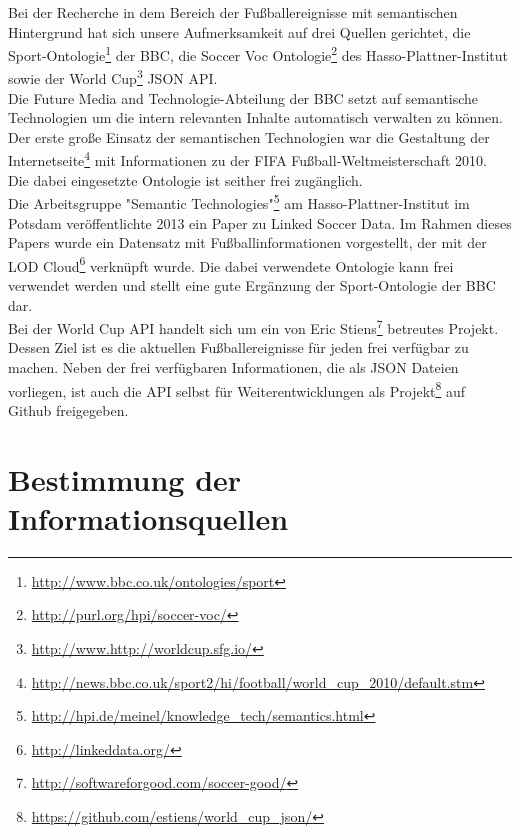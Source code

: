 \documentclass[runningheads,a4paper]{llncs}
\begin{document}
Bei der Recherche in dem Bereich der Fußballereignisse mit semantischen Hintergrund hat sich unsere Aufmerksamkeit auf drei Quellen gerichtet, die Sport-Ontologie\footnote{\url{http://www.bbc.co.uk/ontologies/sport}} der BBC, die Soccer Voc Ontologie\footnote{\url{http://purl.org/hpi/soccer-voc/}} des Hasso-Plattner-Institut sowie der World Cup\footnote{\url{http://www.http://worldcup.sfg.io/}} JSON API.\\ Die Future Media and Technologie-Abteilung der BBC setzt auf semantische Technologien um die intern relevanten Inhalte automatisch verwalten zu können. Der erste große Einsatz der semantischen Technologien war die Gestaltung der Internetseite\footnote{\url{http://news.bbc.co.uk/sport2/hi/football/world_cup_2010/default.stm}} mit Informationen zu der FIFA Fußball-Weltmeisterschaft 2010. Die dabei eingesetzte Ontologie ist seither frei zugänglich. \\
Die Arbeitsgruppe "Semantic Technologies"\footnote{\url{http://hpi.de/meinel/knowledge_tech/semantics.html}} am Hasso-Plattner-Institut im Potsdam veröffentlichte 2013 ein Paper zu Linked Soccer Data\cite{url_lsd}. Im Rahmen dieses Papers wurde ein Datensatz mit Fußballinformationen vorgestellt, der mit der LOD Cloud\footnote{\url{http://linkeddata.org/}} verknüpft wurde. Die dabei verwendete Ontologie kann frei verwendet werden und stellt eine gute Ergänzung der Sport-Ontologie der BBC dar.\\
Bei der World Cup API handelt sich um ein von Eric Stiens\footnote{\url{http://softwareforgood.com/soccer-good/}} betreutes Projekt. Dessen Ziel ist es die aktuellen Fußballereignisse für jeden frei verfügbar zu machen. Neben der frei verfügbaren Informationen, die als JSON Dateien vorliegen, ist auch die API selbst für Weiterentwicklungen als Projekt\footnote{\url{https://github.com/estiens/world_cup_json/}} auf Github freigegeben. 


\section{Bestimmung der Informationsquellen}\label{infoQuell}
\end{document}
